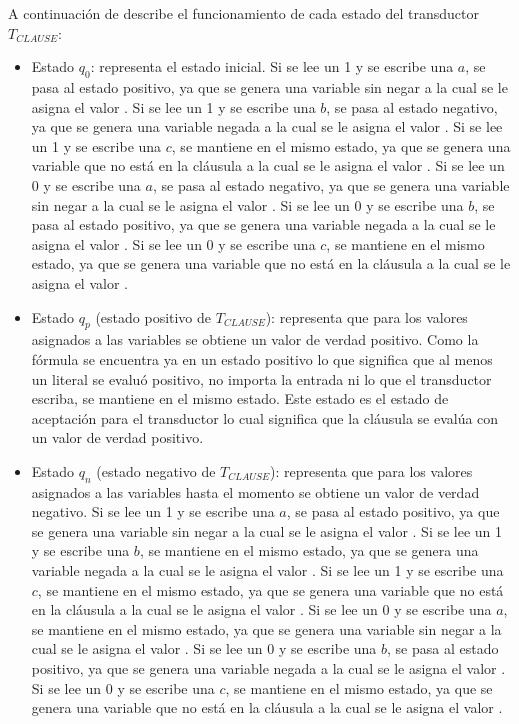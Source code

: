 A continuación de describe el funcionamiento de cada estado del transductor $T_{CLAUSE}$:
\begin{itemize}
    \item Estado $q_0$: representa el estado inicial.
          Si se lee un 1 y se escribe una $a$, se pasa al estado positivo, ya que se genera una variable sin negar a la cual se le asigna el valor \true{}.  
          Si se lee un 1 y se escribe una $b$, se pasa al estado negativo, ya que se genera una variable negada a la cual se le asigna el valor \true{}.  
          Si se lee un 1 y se escribe una $c$, se mantiene en el mismo estado, ya que se genera una variable que no está en la cláusula a la cual se le asigna el valor \true{}.  
          Si se lee un 0 y se escribe una $a$, se pasa al estado negativo, ya que se genera una variable sin negar a la cual se le asigna el valor \false{}.  
          Si se lee un 0 y se escribe una $b$, se pasa al estado positivo, ya que se genera una variable negada a la cual se le asigna el valor \false{}.  
          Si se lee un 0 y se escribe una $c$, se mantiene en el mismo estado, ya que se genera una variable que no está en la cláusula a la cual se le asigna el valor \false{}.
          
    \item Estado $q_p$ (estado positivo de $T_{CLAUSE}$): representa que para los valores asignados a las variables se obtiene un valor de verdad positivo.
          Como la fórmula se encuentra ya en un estado positivo lo que significa que al menos un literal se evaluó positivo, no importa la entrada ni lo que el transductor escriba, 
          se mantiene en el mismo estado. Este estado es el estado de aceptación para el transductor lo cual significa que la cláusula se evalúa con un valor de verdad positivo.
          
    \item Estado $q_n$ (estado negativo de $T_{CLAUSE}$): representa que para los valores asignados a las variables hasta el momento se obtiene un valor de verdad negativo.
          Si se lee  un 1 y se escribe una $a$, se pasa al estado positivo, ya que se genera una variable sin negar a la cual se le asigna el valor \true{}.
          Si se lee  un 1 y se escribe una $b$, se mantiene en el mismo estado, ya que se genera una variable negada a la cual se le asigna el valor \true{}.
          Si se lee  un 1 y se escribe una $c$, se mantiene en el mismo estado, ya que se genera una variable que no está en la cláusula a la cual se le asigna el valor \true{}.
          Si se lee  un 0 y se escribe una $a$, se mantiene en el mismo estado, ya que se genera una variable sin negar a la cual se le asigna el valor \false{}.
          Si se lee  un 0 y se escribe una $b$, se pasa al estado positivo, ya que se genera una variable negada a la cual se le asigna el valor \false{}.
          Si se lee  un 0 y se escribe una $c$, se mantiene en el mismo estado, ya que se genera una variable que no está en la cláusula a la cual se le asigna el valor \false{}.
          
\end{itemize}

